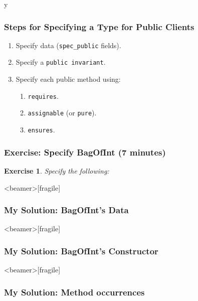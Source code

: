 \if y\MAKEHANDOUTS \documentclass[compress,landscape,handout]{beamer}
\newtheorem*{exercise}{Exercise}
\begin{document}
\begin{frame}[fragile]
\frametitle{Steps for Specifying a Type for Public Clients}

\begin{enumerate}
\item
Specify data (\lstinline!spec_public! fields).

\item
Specify a \lstinline!public invariant!.

\item
Specify each public method using:

\begin{enumerate}
\item
\lstinline!requires!.

\item
\lstinline!assignable! (or \lstinline!pure!).

\item
\lstinline!ensures!.
\end{enumerate}
\end{enumerate}
\end{frame}

\begin{frame}[fragile]
\frametitle{Exercise: Specify BagOfInt (7 minutes)}

\begin{exercise}
Specify the following:

\rm

\end{exercise}
\end{frame}

\begin{frame}<beamer>[fragile]
\frametitle{My Solution: BagOfInt's Data}


\end{frame}

\begin{frame}<beamer>[fragile]
\frametitle{My Solution: BagOfInt's Constructor}


\end{frame}

\begin{frame}<beamer>[fragile]
\frametitle{My Solution: Method occurrences}


\end{frame}
\end{document}
